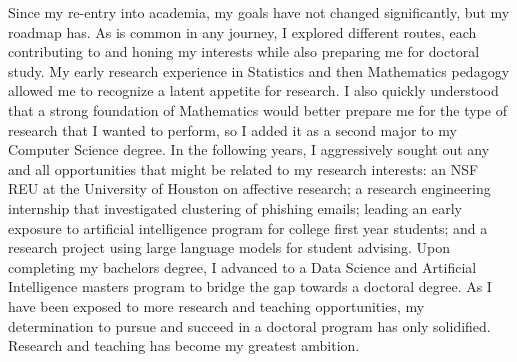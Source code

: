 \documentclass[12pt]{article}
\begin{document}
Since my re-entry into academia, my goals have not changed significantly, but my
roadmap has. As is common in any journey, I explored different routes, each
contributing to and honing my interests while also preparing me for doctoral
study.  My early research experience in Statistics and then Mathematics pedagogy
allowed me to recognize a latent appetite for research.  I also quickly understood
that a strong foundation of Mathematics would better prepare me for the type of
research that I wanted to perform, so I added it as a second major to my Computer
Science degree.  In the following years, I aggressively sought out any
and all opportunities that might be related to my research
interests: an NSF REU at the University of Houston on affective
research; a research engineering internship that investigated
clustering of phishing emails; leading an early exposure to artificial
intelligence program for college first year students; and a research project
using large language models for student advising.  Upon completing my bachelors
degree, I advanced to a Data Science and Artificial Intelligence
masters program to bridge the gap towards a doctoral degree.  As I have been exposed to
more research and teaching opportunities, my determination to pursue and succeed
in a doctoral program has only solidified.  Research and teaching has become my
greatest ambition.
\end{document}
